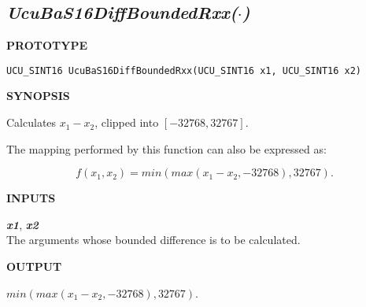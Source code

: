 \subsection[\emph{UcuBaS16DiffBoundedRxx(\protect\mbox{\protect$\cdot$})}]
           {\emph{UcuBaS16DiffBoundedRxx(\protect\mbox{\protect\boldmath $\cdot$})}}
\label{cbaf0:sscf1:sfss0}

%

\noindent\textbf{PROTOTYPE}
\begin {list}{}{\setlength{\leftmargin}{0.25in}\setlength{\topsep}{0.0in}}
\item
\begin{verbatim}
UCU_SINT16 UcuBaS16DiffBoundedRxx(UCU_SINT16 x1, UCU_SINT16 x2)
\end{verbatim}
\end{list}
\vspace{2.8ex}

\noindent\textbf{SYNOPSIS}
\begin{list}{}{\setlength{\leftmargin}{0.25in}\setlength{\topsep}{0.0in}}
\item Calculates $x_1-x_2$, clipped into $[-32768, 32767]$.
\item The mapping performed by this function can also be expressed as:

      \begin{equation}
      \label{eq:cbaf0:sscf1:sfss0:01}
      f(x_1, x_2) = min(max(x_1 - x_2, -32768), 32767) .
      \end{equation}
\end{list}
\vspace{2.8ex}

\noindent\textbf{INPUTS}
\begin{list}{}{\setlength{\leftmargin}{0.5in}\setlength{\itemindent}{-0.25in}\setlength{\topsep}{0.0in}\setlength{\partopsep}{0.0in}}
\item \emph{\textbf{x1}}, \emph{\textbf{x2}}\\
      The arguments whose bounded difference is to be calculated.
\end{list}
\vspace{2.8ex}

\noindent\textbf{OUTPUT}
\begin{list}{}{\setlength{\leftmargin}{0.25in}\setlength{\topsep}{0.0in}}
\item $min(max(x_1 - x_2, -32768), 32767)$.
\end{list}
\vspace{2.8ex}

